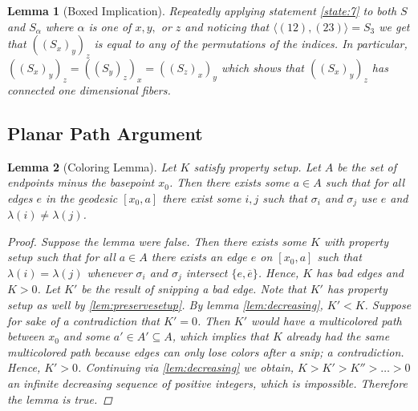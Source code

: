 \documentclass{article}
\newcommand{\sxyz}{((S_x)_y)_z}
\newcommand{\Sxyz}[3]{((S_#1)_#2)_#3}
\theoremstyle{mystyle}
\newtheorem{lem}{Lemma}[section]
\theoremstyle{remark}
\begin{document}
\begin{lem}
    [Boxed Implication]
 \label{lem:boximp} 
    Repeatedly applying statement \ref{state:7} to both \(S\) and \(S_{\alpha}\) where \(\alpha\) is one of \(x,y,\) or \(z\)  and noticing that \(\langle (12),(23) \rangle = S_{3}\) we get that \(\sxyz\) is equal to any of the permutations of the indices. In particular, \(\Sxyz{x}{y}{z}=\Sxyz{y}{z}{x}=\Sxyz{z}{x}{y}\) which shows that \(\sxyz\) has connected one dimensional fibers.
\end{lem}
\subsection{Planar Path Argument}

 \label{lem:ppa} 
\begin{lem}[Coloring Lemma]
    \label{lem:coloring} 
    Let \(K\) satisfy property setup. Let \(A\) be the set of endpoints minus the basepoint \(x_{ 0}\). Then there exists some \(a \in A\) such that for all edges \(e\) in the geodesic \([x_{0} , a]\) there exist some \(i, j\) such that \(\sigma_{i}\) and \(\sigma_{j}\) use \(e\) and \(\lambda ( i ) \neq \lambda ( j )\).
    \begin{proof}
        Suppose the lemma were false. Then there exists some \(K\) with property setup such that for all \(a \in A\) there exists an edge \(e\) on \([x_{0} , a]\) such that \(\lambda (i)= \lambda (j)\) whenever \(\sigma_{i}\) and \(\sigma_{j}\) intersect \(\{e, \overline{e}\}\). Hence, \(K\) has bad edges and \(K > 0\). Let \(K'\) be the result of snipping a bad edge. Note that \(K'\) has property setup as well by \ref{lem:preservesetup}. By lemma \ref{lem:decreasing}, \(K'<K\). Suppose for sake of a contradiction that \(K' = 0\). Then \(K'\) would have a multicolored path between \(x_{0}\) and some \(a' \in A' \subseteq A\), which implies that \(K\) already had the same multicolored path because edges can only lose colors after a snip; a contradiction. Hence, \(K' > 0\). Continuing via \ref{lem:decreasing}  we obtain, \(K > K' > K'' > \ldots > 0\) an infinite decreasing sequence of positive integers, which is impossible. Therefore the lemma is true.
    \end{proof}
\end{lem}
\end{document}
